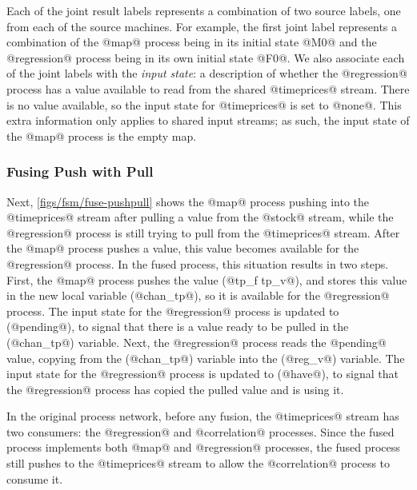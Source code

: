 Each of the joint result labels represents a combination of two source labels, one from each of the source machines.
For example, the first joint label  represents a combination of the @map@ process being in its initial state @M0@ and the @regression@ process being in its own initial state @F0@. 
We also associate each of the joint labels with the \emph{input state}: a description of whether the @regression@ process has a value available to read from the shared @timeprices@ stream.
There is no value available, so the input state for @timeprices@ is set to @none@.
This extra information only applies to shared input streams; as such, the input state of the @map@ process is the empty map.

\subsubsection{Fusing Push with Pull}
\label{s:Fusion:FusingPushPull}

Next, \autoref{figs/fsm/fuse-pushpull} shows the @map@ process pushing into the @timeprices@ stream after pulling a value from the @stock@ stream, while the @regression@ process is still trying to pull from the @timeprices@ stream.
After the @map@ process pushes a value, this value becomes available for the @regression@ process.
In the fused process, this situation results in two steps.
First, the @map@ process pushes the value (@tp_f tp_v@), and stores this value in the new local variable (@chan_tp@), so it is available for the @regression@ process.
The input state for the @regression@ process is updated to (@pending@), to signal that there is a value ready to be pulled in the (@chan_tp@) variable.
Next, the @regression@ process reads the @pending@ value, copying from the (@chan_tp@) variable into the (@reg_v@) variable.
The input state for the @regression@ process is updated to (@have@), to signal that the @regression@ process has copied the pulled value and is using it.

In the original process network, before any fusion, the @timeprices@ stream has two consumers: the @regression@ and @correlation@ processes.
Since the fused process implements both @map@ and @regression@ processes, the fused process still pushes to the @timeprices@ stream to allow the @correlation@ process to consume it.

